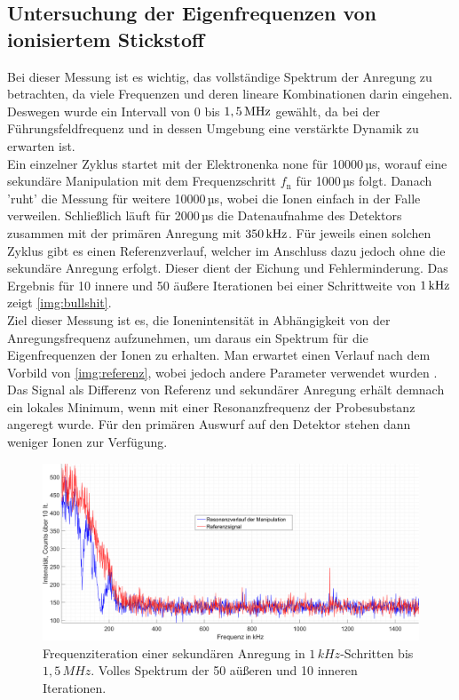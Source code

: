 \documentclass[numbers=noenddot,a4paper,notitlepage,twoside,BCOR15mm]{scrartcl}
\newcommand{\ix}[1]{_\text{#1}}
\begin{document}
		\subsection{Untersuchung der Eigenfrequenzen von ionisiertem Stickstoff}\label{subsec:mess}

			Bei dieser Messung ist es wichtig, das vollständige Spektrum der Anregung zu betrachten, da viele Frequenzen und deren lineare Kombinationen darin eingehen. Deswegen wurde ein Intervall von 0 bis $\unit[1,5]{MHz}$ gewählt, da bei der Führungsfeldfrequenz und in dessen Umgebung eine verstärkte Dynamik zu erwarten ist.\\
			Ein einzelner Zyklus startet mit der Elektronenka none für 10000\,µs, worauf eine sekundäre Manipulation mit dem Frequenzschritt $f\ix{n}$ für 1000\,µs folgt. Danach 'ruht' die Messung für weitere 10000\,µs, wobei die Ionen einfach in der Falle verweilen. Schließlich läuft für 2000\,µs die Datenaufnahme des Detektors zusammen mit der primären Anregung mit $\unit[350]{kHz}$. Für jeweils einen solchen Zyklus gibt es einen Referenzverlauf, welcher im Anschluss dazu jedoch ohne die sekundäre Anregung erfolgt. Dieser dient der Eichung und Fehlerminderung. Das Ergebnis für 10 innere und 50 äußere Iterationen bei einer Schrittweite von $\unit[1]{kHz}$ zeigt \autoref{img:bullshit}.\\
			Ziel dieser Messung ist es, die Ionenintensität in Abhängigkeit von der Anregungsfrequenz aufzunehmen, um daraus ein Spektrum für die Eigenfrequenzen der Ionen zu erhalten. Man erwartet einen Verlauf nach dem Vorbild von \autoref{img:referenz}, wobei jedoch andere Parameter verwendet wurden \cite{Paul-FalleREF}. Das Signal als Differenz von Referenz und sekundärer Anregung erhält demnach ein lokales Minimum, wenn mit einer Resonanzfrequenz der Probesubstanz angeregt wurde. Für den primären Auswurf auf den Detektor stehen dann weniger Ionen zur Verfügung.

				\begin{figure}[H]
					\includegraphics[width=\textwidth]{volle_daten.png}
					\caption{Frequenziteration einer sekundären Anregung in $1\,kHz$-Schritten bis $1,5\,MHz$. Volles Spektrum der 50 aüßeren und 10 inneren Iterationen.}\label{img:bullshit}
				\end{figure}
\end{document}
